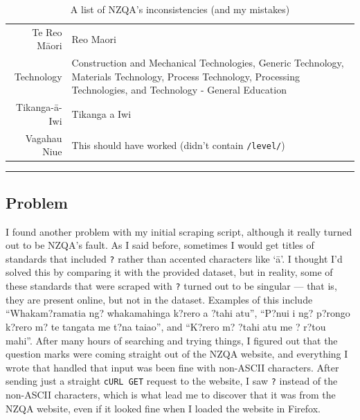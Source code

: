 \documentclass{article}
\begin{document}
\begin{table}[ht]
{\begin{tabularx}{\textwidth}{r|X}
        Te Reo M\={a}ori & Reo Maori \\
        Technology & Construction and Mechanical Technologies, Generic Technology, Materials Technology, Process Technology, Processing Technologies, and  Technology - General Education \\
        Tikanga-\={a}-Iwi & Tikanga a Iwi \\ 
        Vagahau Niue & This should have worked (didn't contain \texttt{/level/}) \\
    \end{tabularx}
    }
    \caption{A list of NZQA's inconsistencies (and my mistakes)}
    \label{tab:inconsistencies}
\end{table}

\begin{center}
\rule{0.5\textwidth}{0.2pt}
\end{center}

\subsection*{Problem}
I found another problem with my initial scraping script, although it really turned out to be NZQA's fault. As I said before, sometimes I would get titles of standards that included \texttt{?} rather than accented characters like `\={a}'. I thought I'd solved this by comparing it with the provided dataset, but in reality, some of these standards that were scraped with \texttt{?} turned out to be singular --- that is, they are present online, but not in the dataset. Examples of this include ``Whakam?ramatia ng? whakamahinga k?rero a ?tahi atu'',  ``P?nui i ng? p?rongo k?rero m? te tangata me t?na taiao'', and ``K?rero m? ?tahi atu me ? r?tou mahi''. After many hours of searching and trying things, I figured out that the question marks were coming straight out of the NZQA website, and everything I wrote that handled that input was been fine with non-ASCII characters. After sending just a straight \texttt{cURL GET} request to the website, I saw \texttt{?} instead of the non-ASCII characters, which is what lead me to discover that it was from the NZQA website, even if it looked fine when I loaded the website in Firefox.
\end{document}
